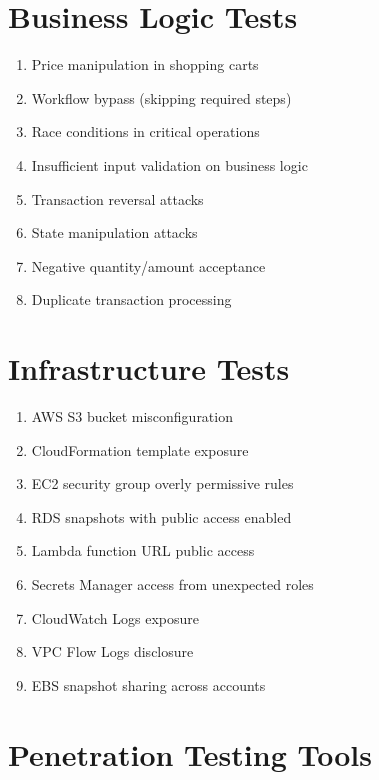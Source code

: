 \documentclass{report}
\begin{document}
\section{Business Logic Tests}

\begin{enumerate}
\item Price manipulation in shopping carts
\item Workflow bypass (skipping required steps)
\item Race conditions in critical operations
\item Insufficient input validation on business logic
\item Transaction reversal attacks
\item State manipulation attacks
\item Negative quantity/amount acceptance
\item Duplicate transaction processing
\end{enumerate}

\section{Infrastructure Tests}

\begin{enumerate}
\item AWS S3 bucket misconfiguration
\item CloudFormation template exposure
\item EC2 security group overly permissive rules
\item RDS snapshots with public access enabled
\item Lambda function URL public access
\item Secrets Manager access from unexpected roles
\item CloudWatch Logs exposure
\item VPC Flow Logs disclosure
\item EBS snapshot sharing across accounts
\end{enumerate}

\section{Penetration Testing Tools}
\end{document}

